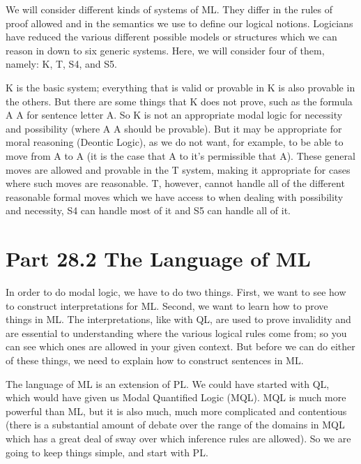 We will consider different kinds of systems of ML. They differ in the rules of proof allowed and in the semantics we use to define our logical notions. Logicians have reduced the various different possible models or structures which we can reason in down to six generic systems. Here, we will consider four of them, namely: K, T, S4, and S5. 

K is the basic system; everything that is valid or provable in K is also provable in the others. But there are some things that K does not prove, such as the formula \ebox A \eif A for sentence letter A. So K is not an appropriate modal logic for necessity and possibility (where \ebox A \eif A should be provable). But it may be appropriate for moral reasoning (Deontic Logic), as we do not want, for example, to be able to move from A to \ediamond A (it is the case that A to it's permissible that A). These general moves are allowed and provable in the T system, making it appropriate for cases where such moves are reasonable. T, however, cannot handle all of the different reasonable formal moves which we have access to when dealing with possibility and necessity, S4 can handle most of it and S5 can handle all of it.  
\section{Part 28.2 The Language of ML}
In order to do modal logic, we have to do two things. First, we want to see how to construct interpretations for ML. Second, we want to learn how to prove things in ML. The interpretations, like with QL, are used to prove invalidity and are essential to understanding where the various logical rules come from; so you can see which ones are allowed in your given context. But before we can do either of these things, we need to explain how to construct sentences in ML.

The language of ML is an extension of PL. We could have started with QL, which would have given us Modal Quantified Logic (MQL). MQL is much more powerful than ML, but it is also much, much more complicated and contentious (there is a substantial amount of debate over the range of the domains in MQL which has a great deal of sway over which inference rules are allowed). So we are going to keep things simple, and start with PL.

